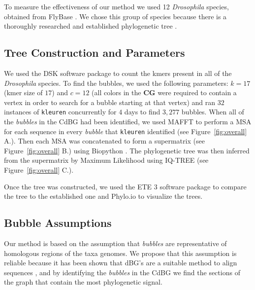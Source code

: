 \documentclass[hidelinks, 10pt, conference, compsocconf]{IEEEtran}
\begin{document}
To measure the effectiveness of our method we used 12 \textit{Drosophila} species, obtained from FlyBase \cite{FlyBase}.
We chose this group of species because there is a thoroughly researched and established phylogenetic tree \cite{Hahn-true-tree}.

\subsection{Tree Construction and Parameters}\label{sec:tree-construction}

We used the DSK software package \cite{DSK} to count the kmers present in all of the \textit{Drosophila} species.
To find the bubbles, we used the following parameters: $k = 17$ (kmer size of $17$) and $c = 12$ (all colors in the $\mathbf{CG}$ were required to contain a vertex in order to search for a bubble starting at that vertex) and ran $32$ instances of \texttt{kleuren} concurrently for $4$ days to find $3,277$ bubbles.
When all of the \textit{bubbles} in the CdBG had been identified, we used MAFFT \cite{MAFFT} to perform a MSA for each sequence in every \textit{bubble} that \texttt{kleuren} identified (see Figure~\ref{fig:overall} A.).
Then each MSA was concatenated to form a supermatrix (see Figure~\ref{fig:overall} B.) using Biopython \cite{Biopython}.
The phylogenetic tree was then inferred from the supermatrix by Maximum Likelihood using IQ-TREE \cite{iqtree} (see Figure~\ref{fig:overall} C.).

Once the tree was constructed, we used the ETE 3 software package \cite{ETE3} to compare the tree to the established one and Phylo.io \cite{phylo.io} to visualize the trees.

\subsection{Bubble Assumptions}

Our method is based on the assumption that \textit{bubbles} are representative of homologous regions of the taxa genomes.
We propose that this assumption is reliable because it has been shown that dBG's are a suitable method to align sequences \cite{MultipleAlignment,Sibelia,TwoPaCo}, and by identifying the \textit{bubbles} in the CdBG we find the sections of the graph that contain the most phylogenetic signal.
\end{document}
